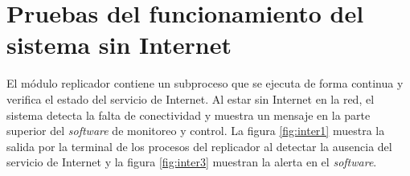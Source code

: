 



\section{Pruebas del funcionamiento del sistema sin Internet}

El módulo replicador contiene un subproceso que se ejecuta de forma continua y verifica el estado del servicio de Internet. Al estar sin Internet en la red, el sistema detecta la falta de conectividad y muestra un mensaje en la parte superior del \emph{software} de monitoreo y control. La figura \ref{fig:inter1} muestra la salida por la terminal de los procesos del replicador al detectar la ausencia del servicio de Internet y la figura \ref{fig:inter3} muestran la alerta en el \emph{software}. 



